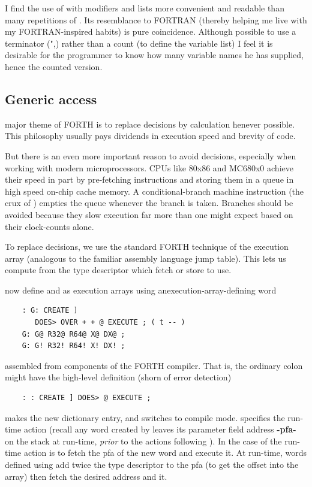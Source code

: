 I find the use of  with modifiers and lists more convenient and readable than many repetitions of . Its resemblance to FORTRAN (thereby helping me live with my FORTRAN-inspired habits) is pure coincidence. Although possible to use a terminator (",\eg) rather than a count (to define the variable list) I feel it is desirable for the programmer to know how many variable names he has supplied, hence the counted version.

\subsection{Generic access}
 major theme of FORTH is to replace decisions by calculation henever possible. This philosophy usually pays dividends in execution speed and brevity of code. 

But there is an even more important reason to avoid  decisions, especially when working with modern microprocessors. CPUs like 80x86 and MC680x0 achieve their speed in part by pre-fetching instructions and storing them in a queue in high speed on-chip cache memory. A conditional-branch machine instruction (the crux of ) empties the queue whenever the branch is taken. Branches should be avoided because they slow execution far more than one might expect based on their clock-counts alone.

To replace decisions, we use the standard FORTH technique of the execution array (analogous to the familiar assembly language jump table). This lets us compute from the type descriptor which fetch or store to use.

 now define  and  as execution arrays using anexecution-array-defining word 

\begin{lstlisting}
    : G: CREATE ]
       DOES> OVER + + @ EXECUTE ; ( t -- )
    G: G@ R32@ R64@ X@ DX@ ;
    G: G! R32! R64! X! DX! ;
\end{lstlisting}

assembled from components of the FORTH compiler. That is, the ordinary colon \bc{:} might have the high-level definition (shorn of error detection)

\begin{lstlisting}
    : : CREATE ] DOES> @ EXECUTE ;
\end{lstlisting}

 makes the new dictionary entry, and \bc{]} switches to
compile mode.  specifies the run-time action (recall any word created by  leaves its parameter field address
\textbf{-pfa-} on the stack at run-time, \textit{prior} to the actions following ). In the case of \bc{:} the run-time action is to fetch the pfa of the new word and execute it. At run-time, words defined using  add twice the type descriptor to the pfa (to get the offset into the array) then fetch the desired address and  it.

